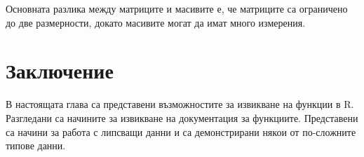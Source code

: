 Основната разлика между матриците и масивите е, че матриците са ограничено до две размерности, докато масивите могат да имат много измерения.

\section*{Заключение}

В настоящата глава са представени възможностите за извикване на функции в R. Разгледани са начините за извикване на документация за функциите. Представени са начини за работа с липсващи данни и са демонстрирани някои от по-сложните типове данни. 

